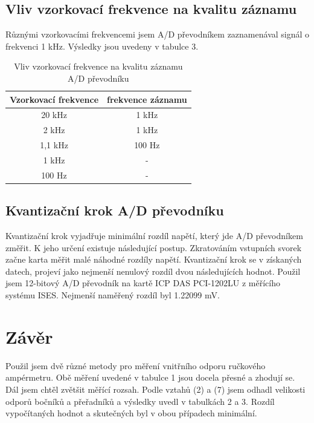 \documentclass[a4paper,11pt]{article}
\begin{document}
\subsection{Vliv vzorkovací frekvence na kvalitu záznamu}

Různými vzorkovacími frekvencemi jsem A/D převodníkem zaznamenával signál o frekvenci 1 kHz. Výsledky jsou uvedeny v tabulce 3.

\begin{table}[htpb]
  \centering
  \begin{tabular}{ | c | c | }
    \hline
    Vzorkovací frekvence & frekvence záznamu \\\hline
    20 kHz & 1 kHz \\
    2 kHz & 1 kHz \\
    1,1 kHz & 100 Hz \\
    1 kHz & - \\
    100 Hz & - \\\hline
  \end{tabular}
  \caption{Vliv vzorkovací frekvence na kvalitu záznamu A/D převodníku}
\end{table}

\subsection{Kvantizační krok A/D převodníku}

Kvantizační krok vyjadřuje minimální rozdíl napětí, který jde A/D převodníkem změřit. 
K jeho určení existuje následující postup. Zkratováním vstupních svorek začne karta měřit malé náhodné rozdíly napětí. Kvantizační krok se v získaných datech, projeví jako nejmenší nenulový rozdíl dvou následujících hodnot. Použil jsem 12-bitový A/D převodník na kartě ICP DAS PCI-1202LU z měřícího systému ISES. Nejmenší naměřený rozdíl byl 1.22099 mV.

\newpage

\section{Závěr}

Použil jsem dvě různé metody pro měření vnitřního odporu ručkového ampérmetru. Obě měření uvedené v tabulce 1 jsou docela přesné a zhodují se. Dál jsem chtěl zvětšit měřící rozsah. Podle vztahů (2) a (7) jsem odhadl velikosti odporů bočníků a přeřadníků a výsledky uvedl v tabulkách 2 a 3. Rozdíl vypočítaných hodnot a skutečných byl v obou případech minimální. \\
\end{document}
